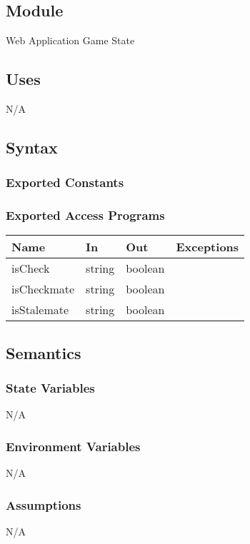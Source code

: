 \documentclass[12pt, titlepage]{article}
\begin{document}
    \subsection{Module}
    Web Application Game State

    \subsection{Uses}
    N/A

    \subsection{Syntax}
    \subsubsection{Exported Constants}

    \subsubsection{Exported Access Programs}
        \begin{center}
        \begin{tabular}{p{3.5cm} p{3cm} p{3cm} p{2.5cm}}
        \hline
        \textbf{Name} & \textbf{In} & \textbf{Out} & \textbf{Exceptions} \\
        \hline
        isCheck & string & boolean & \\
        \hline
        isCheckmate & string & boolean & \\
        \hline
        isStalemate & string & boolean & \\
        \hline
        \end{tabular}
        \end{center}

    \subsection{Semantics}
    \subsubsection{State Variables}
    N/A

    \subsubsection{Environment Variables}
    N/A

    \subsubsection{Assumptions}
    N/A
\end{document}
